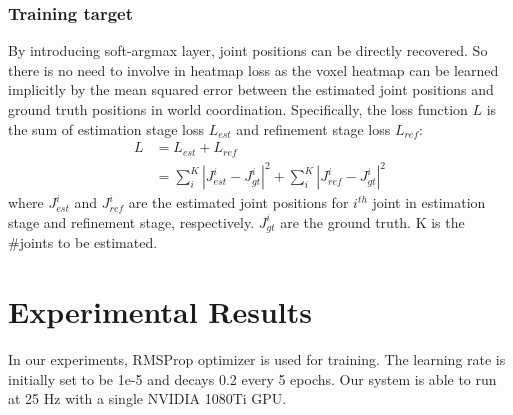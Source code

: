 \documentclass[10pt,twocolumn,letterpaper]{article}
\begin{document}
\vspace{-0.2cm}
\subsubsection{Training target}
By introducing soft-argmax layer, joint positions can be directly recovered. So there is no need to involve in heatmap loss as the voxel heatmap can be learned implicitly by the mean squared error between the estimated joint positions and ground truth positions in world coordination. Specifically, the loss function $L$ is the sum of estimation stage loss $L_{est}$ and refinement stage loss $L_{ref}$: \begin{equation}
\label{equa:loss}
  \begin{aligned}
  L&=L_{est}+L_{ref}\\&=\sum_{i}^{K}|J_{est}^{i}-J_{gt}^{i}|^{2}+\sum_{i}^{K}|J_{ref}^{i}-J_{gt}^{i}|^{2} 
  \end{aligned}
\end{equation}
where $J_{est}^{i}$ and $J_{ref}^{i}$ are the estimated joint positions for $i^{th}$ joint in estimation stage and refinement stage, respectively. $J_{gt}^{i}$ are the ground truth. K is the \#joints to be estimated. 

\section{Experimental Results}
\label{sec:exp}
 
In our experiments, RMSProp optimizer is used for training. The learning rate is initially set to be 1e-5 and decays 0.2 every 5 epochs. Our system is able to run at 25 Hz with a single NVIDIA 1080Ti GPU. 
\end{document}
